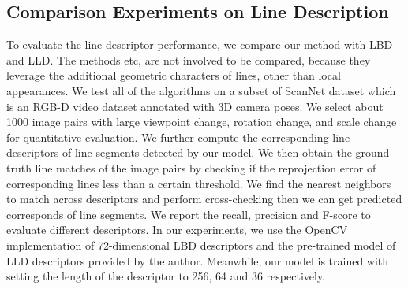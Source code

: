 \documentclass[10pt,twocolumn,letterpaper]{article}
\begin{document}
\subsection{Comparison Experiments on Line Description}
To evaluate the line descriptor performance, we compare our method with LBD\cite{LBD} and LLD\cite{LLD}. The methods \cite{LJL,GNN} etc, are not involved to be compared, because they leverage the additional geometric characters of lines, other than local appearances. We test all of the algorithms on a subset of ScanNet dataset\cite{scannet} which is an RGB-D video dataset annotated with 3D camera poses. We select about 1000 image pairs with large viewpoint change, rotation change, and scale change for quantitative evaluation. We further compute the corresponding line descriptors of line segments detected by our model. We then obtain the ground truth line matches of the image pairs by checking if the reprojection error of corresponding lines less than a certain threshold.
We find the nearest neighbors to match across descriptors and perform cross-checking then we can get predicted corresponds of line segments.
We report the recall, precision and F-score to evaluate different descriptors. In our experiments, we use the OpenCV implementation of 72-dimensional LBD descriptors and the pre-trained model of LLD descriptors provided by the author. Meanwhile, our model is trained with setting the length of the descriptor to 256, 64 and 36 respectively.
\end{document}
